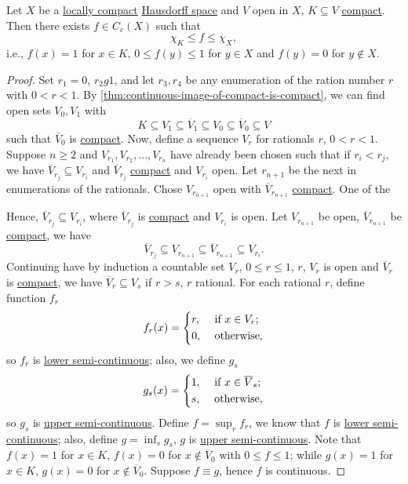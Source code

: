\begin{theorem}\label{thm:Urysohn-lemma}
	Let \(X\) be a \hyperref[def:locally-compact]{locally compact} \hyperref[def:Hausdorff]{Hausdorff space} and \(V\) open in \(X\), \(K \subseteq V\) \hyperref[def:compact]{compact}. Then there exists \(f\in C_c(X)\) such that
	\[
		\chi _K \leq f \leq \chi _X,
	\]
	i.e., \(f(x) = 1\) for \(x\in K\), \(0 \leq f(y) \leq 1\) for \(y\in X\) and \(f(y) = 0\) for \(y \notin X\).
\end{theorem}
\begin{proof}
	Set \(r_1 = 0\), \(r_2 g 1\), and let \(r_3, r_4 \) be any enumeration of the ration number \(r\) with \(0 < r < 1\). By \autoref{thm:continuous-image-of-compact-is-compact}, we can find open sets \(V_0, V_1\) with
	\[
		K \subseteq V_1 \subseteq \overline{V} _1 \subseteq V_0 \subseteq \overline{V} _0 \subseteq V
	\]
	such that \(\overline{V} _0\) is \hyperref[def:compact]{compact}. Now, define a sequence \(V_r\) for rationals \(r\), \(0 < r < 1\). Suppose \(n \geq 2\) and \(V_{r_1}, V_{r_2}, \ldots  , V_{r_n}\) have already been chosen such that if \(r_i < r_j\), we have \(\overline{V}_{r_j} \subseteq V_{r_i}\) and \(\overline{V} _{r_j}\) \hyperref[def:compact]{compact} and \(V_{r_i}\) open. Let \(r_{n+1}\) be the next in enumerations of the rationals. Chose \(V_{r_{n+1}}\) open with \(\overline{V} _{r_{n+1}}\) \hyperref[def:compact]{compact}. One of the

	Hence, \(\overline{V} _{r_j} \subseteq V_{r_i}\), where \(\overline{V} _{r_j}\) is \hyperref[def:compact]{compact} and \(V_{r_i}\) is open. Let \(V_{r_{n+1}}\) be open, \(\overline{V} _{r_{n+1}}\) be \hyperref[def:compact]{compact}, we have
	\[
		\overline{V} _{r_j} \subseteq V_{r_{n+1}} \subseteq \overline{V} _{r_{n+1}} \subseteq V_{r_i}.
	\]
	Continuing have by induction a countable set \(V_r\), \(0 \leq r \leq 1\), \(r\), \(V_r\) is open and \(\overline{V} _r\) is \hyperref[def:compact]{compact}, we have \(\overline{V} _r \subseteq V_s\) if \(r > s\), \(r\) rational. For each rational \(r\), define function \(f_r\)
	\[
		f_r(x) = \begin{dcases}
			r, & \text{ if } x\in V_r ; \\
			0, & \text{ otherwise},
		\end{dcases}
	\]
	so \(f_r\) is \hyperref[def:lower-semi-continuous]{lower semi-continuous}; also, we define \(g_s\)
	\[
		g_s(x) = \begin{dcases}
			1, & \text{ if } x\in \overline{V} _s ; \\
			s, & \text{ otherwise},
		\end{dcases}
	\]
	so \(g_s\) is \hyperref[def:upper-semi-continuous]{upper semi-continuous}. Define \(f = \sup _{r} f_r \), we know that \(f\) is \hyperref[def:lower-semi-continuous]{lower semi-continuous}; also, define \(g = \inf _{s} g_s\), \(g\) is \hyperref[def:upper-semi-continuous]{upper semi-continuous}. Note that \(f(x) = 1\) for \(x\in K\), \(f(x) = 0\) for \(x \notin \overline{V}_0 \) with \(0 \leq f \leq 1\); while \(g(x) = 1\) for \(x\in K\), \(g(x) = 0\) for \(x \notin \overline{V} _0\). Suppose \(f\equiv g\), hence \(f\) is continuous.


\end{proof}

